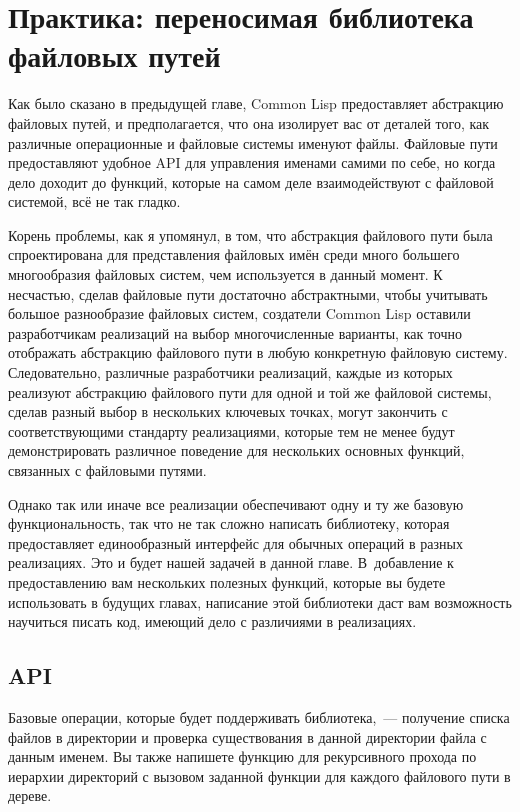 \chapter{Практика: переносимая библиотека файловых путей}
\label{ch:15}

Как было сказано в предыдущей главе, Common Lisp предоставляет абстракцию файловых путей,
и предполагается, что она изолирует вас от деталей того, как различные операционные и
файловые системы именуют файлы. Файловые пути предоставляют удобное API для управления
именами самими по себе, но когда дело доходит до функций, которые на самом деле
взаимодействуют с файловой системой, всё не так гладко.

Корень проблемы, как я упомянул, в том, что абстракция файлового пути была спроектирована
для представления файловых имён среди много большего многообразия файловых систем, чем
используется в данный момент. К несчастью, сделав файловые пути достаточно абстрактными,
чтобы учитывать большое разнообразие файловых систем, создатели Common Lisp оставили
разработчикам реализаций на выбор многочисленные варианты, как точно отображать абстракцию
файлового пути в любую конкретную файловую систему. Следовательно, различные разработчики
реализаций, каждые из которых реализуют абстракцию файлового пути для одной и той же
файловой системы, сделав разный выбор в нескольких ключевых точках, могут закончить с
соответствующими стандарту реализациями, которые тем не менее будут демонстрировать
различное поведение для нескольких основных функций, связанных с файловыми путями.

Однако так или иначе все реализации обеспечивают одну и ту же базовую функциональность,
так что не так сложно написать библиотеку, которая предоставляет единообразный интерфейс
для обычных операций в разных реализациях. Это и будет нашей задачей в данной главе.
В~добавление к предоставлению вам нескольких полезных функций, которые вы будете
использовать в будущих главах, написание этой библиотеки даст вам возможность научиться
писать код, имеющий дело с различиями в реализациях.

\section{API}

Базовые операции, которые будет поддерживать библиотека,~--- получение списка файлов в
директории и проверка существования в данной директории файла с данным именем. Вы также
напишете функцию для рекурсивного прохода по иерархии директорий с вызовом заданной
функции для каждого файлового пути в дереве.

